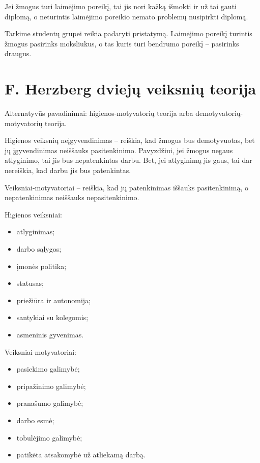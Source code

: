 \begin{exmp}
  Jei žmogus turi laimėjimo poreikį, tai jis nori kažką išmokti ir už
  tai gauti diplomą, o neturintis laimėjimo poreikio nemato problemų
  nusipirkti diplomą.
\end{exmp}

\begin{exmp}
  Tarkime studentų grupei reikia padaryti pristatymą. Laimėjimo poreikį
  turintis žmogus pasirinks moksliukus, o tas kuris turi bendrumo
  poreikį – pasirinks draugus.
\end{exmp}

\section{F. Herzberg dviejų veiksnių teorija}

Alternatyvūs pavadinimai: higienos-motyvatorių teorija arba
demotyvatorių-motyvatorių teorija.

Higienos veiksnių neįgyvendinimas – reiškia, kad žmogus bus demotyvuotas, 
bet jų įgyvendinimas neiššauks pasitenkinimo. Pavyzdžiui, jei žmogus
negaus atlyginimo, tai jis bus nepatenkintas darbu. Bet, jei atlyginimą
jis gaus, tai dar nereiškia, kad darbu jis bus patenkintas.

Veiksniai-motyvatoriai – reiškia, kad jų patenkinimas iššauks pasitenkinimą,
o nepatenkinimas neiššauks nepasitenkinimo.

Higienos veiksniai:
\begin{itemize}
  \item atlyginimas;
  \item darbo sąlygos;
  \item įmonės politika;
  \item statusas;
  \item priežiūra ir autonomija;
  \item santykiai su kolegomis;
  \item asmeninis gyvenimas.
\end{itemize}

Veiksniai-motyvatoriai:
\begin{itemize}
  \item pasiekimo galimybė;
  \item pripažinimo galimybė;
  \item pranašumo galimybė;
  \item darbo esmė;
  \item tobulėjimo galimybė;
  \item patikėta atsakomybė už atliekamą darbą.
\end{itemize}

